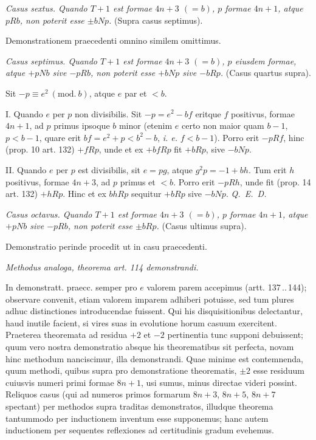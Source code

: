 
\textit{Casus sextus. Quando $T+1$ est formae $4n+3$ $(=b)$, $p$ formae $4n+1$, atque $pRb$, non poterit esse $\pm bNp$.} (Supra casus septimus).

Demonstrationem praecedenti omnino similem omittimus.


\textit{Casus septimus. Quando $T+1$ est formae $4n+3$ $(=b)$, $p$ eiusdem formae, atque $+pNb$ sive $-pRb$, non poterit esse $+bNp$ sive $-bRp$.} (Casus quartus supra).

Sit $-p\equiv e^2\ (\mathrm{mod.}\ b)$, atque $e$ par et $<b$.

I. Quando $e$ per $p$ non divisibilis. Sit $-p=e^2-bf$ eritque $f$ positivus, formae $4n+1$, ad $p$ primus ipsoque $b$ minor (etenim $e$ certo non maior quam $b-1$, $p<b-1$, quare erit $bf=e^2+p<b^2-b$, \textit{i. e.} $f<b-1$). Porro erit $-pRf$, hinc (prop. 10 art. 132) $+fRp$, unde et ex $+bfRp$ fit $+bRp$, sive $-bNp$.

II. Quando $e$ per $p$ est divisibilis, sit $e=pg$, atque $g^2p=-1+bh$. Tum erit $h$ positivus, formae $4n+3$, ad $p$ primus et $<b$. Porro erit $-pRh$, unde fit (prop. 14 art. 132) $+hRp$. Hinc et ex $bhRp$ sequitur $+bRp$ sive $-bNp$. \textit{Q.~E.~D.}


\textit{Casus octavus. Quando $T+1$ est formae $4n+3$ $(=b)$, $p$ formae $4n+1$, atque $+pNb$ sive $-pRb$, non poterit esse $\pm bRp$.} (Casus ultimus supra).

Demonstratio perinde procedit ut in casu praecedenti.

\begin{center}
\textit{Methodus analoga, theorema art. 114 demonstrandi.}
\end{center}


In demonstratt. praecc. semper pro $e$ valorem parem accepimus (artt. 137\,..\,144); observare convenit, etiam valorem imparem adhiberi potuisse, sed tum plures adhuc distinctiones introducendae fuissent. Qui his disquisitionibus delectantur, haud inutile facient, si vires suas in evolutione horum casuum exercitent. Praeterea theoremata ad residua $+2$ et $-2$ pertinentia tunc supponi debuissent; quum vero nostra demonstratio absque his theorematibus sit perfecta, novam hinc methodum nanciscimur, illa demonstrandi. Quae minime est contemnenda, quum methodi, quibus supra pro demonstratione theorematis, $\pm2$ esse residuum cuiusvis numeri primi formae $8n+1$, usi sumus, minus directae videri possint. Reliquos casus (qui ad numeros primos formarum $8n+3$, $8n+5$, $8n+7$ spectant) per methodos supra traditas demonstratos, illudque theorema tantummodo per inductionem inventum esse supponemus; hanc autem inductionem per sequentes reflexiones ad certitudinis gradum evehemus.

